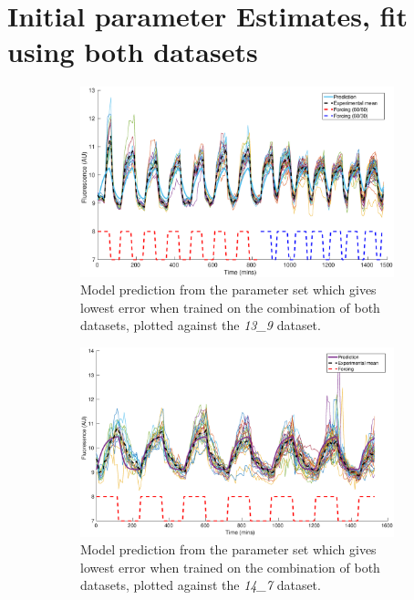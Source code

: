 \documentclass[10pt,journal]{./IEEE_latex_class/IEEEtran}
\begin{document}
\clearpage

\section{Initial parameter Estimates, fit using both datasets}
\label{Bothdatasetfitting}
\setcounter{figure}{0} 

\begin{figure}[H]
    \begin{subfigure}[c]{\textwidth}
    \centering
        \includegraphics[scale = 0.3]{13_9_14_7_with_13_9_bestplot}
        \caption{Model prediction from the parameter set which gives lowest error when trained on the combination of both datasets, plotted against the  \textit{13\_9} dataset. }
    \end{subfigure}
    
    \begin{subfigure}[c]{\textwidth}
    \centering
        \includegraphics[scale = 0.3]{13_9_14_7_with_14_7_bestplot}
        \caption{Model prediction from the parameter set which gives lowest error when trained on the combination of both datasets, plotted against the  \textit{14\_7} dataset.}
    \end{subfigure}
    \caption{}
\label{hist_f}
\end{figure}
\end{document}
